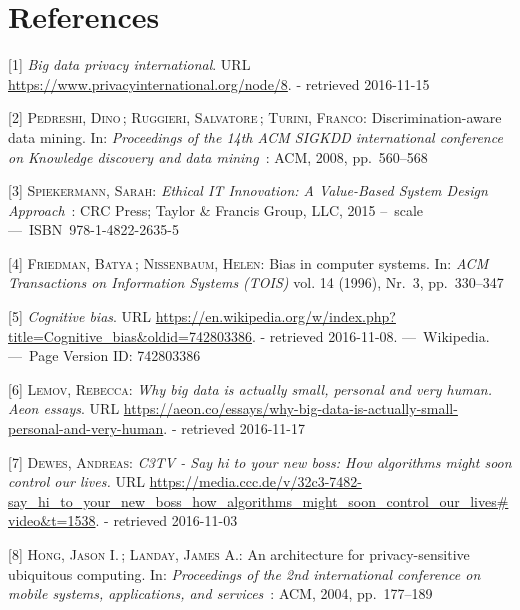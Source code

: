 \documentclass[12pt,english,a4paper,titlepage,cleardoublepage=empty,dottedtoc]{report}
\begin{document}
\chapter*{References}\label{references}

\hypertarget{refs}{}
\hypertarget{ref-web_2016_privacy-international-about-big-data}{}
{[}1{]} \emph{Big data privacy international}. URL
\url{https://www.privacyinternational.org/node/8}. - retrieved
2016-11-15

\hypertarget{ref-paper_2008_discrimination-aware-data-mining}{}
{[}2{]} \textsc{Pedreshi, Dino}\,; \textsc{Ruggieri, Salvatore}\,;
\textsc{Turini, Franco}: Discrimination-aware data mining. In:
\emph{Proceedings of the 14th ACM SIGKDD international conference on
Knowledge discovery and data mining}~: ACM, 2008, pp.~560--568

\hypertarget{ref-book_2015_ethical-it-innovation_ethical-uses-of-information-and-knowledge}{}
{[}3{]} \textsc{Spiekermann, Sarah}: \emph{Ethical IT Innovation: A
Value-Based System Design Approach}~: CRC Press; Taylor \& Francis
Group, LLC, 2015 --~scale ---~ISBN~978-1-4822-2635-5

\hypertarget{ref-paper_1996_bias-in-computer-systems}{}
{[}4{]} \textsc{Friedman, Batya}\,; \textsc{Nissenbaum, Helen}: Bias in
computer systems. In: \emph{ACM Transactions on Information Systems
(TOIS)} vol. 14 (1996), Nr.~3, pp.~330--347

\hypertarget{ref-wikipedia_2016_cognitive-bias}{}
{[}5{]} \emph{Cognitive bias}. URL
\url{https://en.wikipedia.org/w/index.php?title=Cognitive_bias\&oldid=742803386}.
- retrieved 2016-11-08. ---~Wikipedia. ---~Page Version ID: 742803386

\hypertarget{ref-web_2016_big-data-is-people}{}
{[}6{]} \textsc{Lemov, Rebecca}: \emph{Why big data is actually small,
personal and very human. Aeon essays}. URL
\url{https://aeon.co/essays/why-big-data-is-actually-small-personal-and-very-human}.
- retrieved 2016-11-17

\hypertarget{ref-video_2015_big-data-and-deep-learning_discrimination}{}
{[}7{]} \textsc{Dewes, Andreas}: \emph{C3TV - Say hi to your new boss:
How algorithms might soon control our lives.} URL
\url{https://media.ccc.de/v/32c3-7482-say_hi_to_your_new_boss_how_algorithms_might_soon_control_our_lives\#video\&t=1538}.
- retrieved 2016-11-03

\hypertarget{ref-study_2004_architecture-for-privacy-sensitive-ubiquitous-computing}{}
{[}8{]} \textsc{Hong, Jason I.}\,; \textsc{Landay, James A.}: An
architecture for privacy-sensitive ubiquitous computing. In:
\emph{Proceedings of the 2nd international conference on mobile systems,
applications, and services}~: ACM, 2004, pp.~177--189
\end{document}
